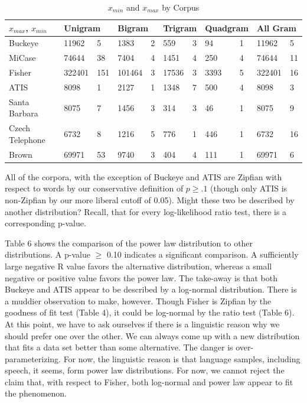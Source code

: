\documentclass[12pt]{article}
\begin{document}
\begin{table}[H]
\caption{$x_{min}$ and $x_{max}$ by Corpus}
\begin{center}
\begin{tabular}{| *{11}{l|} }
    \hline
$x_{max}$, $x_{min}$    & \multicolumn{2}{l|}{Unigram}
            & \multicolumn{2}{l|}{Bigram}
                    & \multicolumn{2}{l|}{Trigram}
                            & \multicolumn{2}{l|}{Quadgram} 
                            & \multicolumn{2}{l|}{All Gram}\\
    \hline
Buckeye   &   11962  &   5  & 1383 & 2&   559  &   3  &   94  &   1  &   11962  &   5  \\
    \hline
MiCase   &   74644  &   38  &   7404  &   4  &   1451  &   4  &   250  &   4 & 74644 & 11  \\
    \hline
Fisher   &  322401 & 151 & 101464 & 3 & 17536 & 3 & 3393 & 5 & 322401 & 16\\
    \hline
ATIS   &  8098     &    1   &   2127    &   1    &      1348 &  7     &     500  &      4 & 8098 & 3 \\
    \hline
Santa Barbara   &  8075     &   7    &  1456     &      3 & 314& 3&  46      & 1      & 8075      &      9 \\    \hline
Czech Telephone   &   6732    &     8  &    1216   &    5   &  776     &     1  & 446       & 1     & 6732 & 16  \\
    \hline
Brown & 69971 & 53 & 9740 & 3 & 404 & 4 & 111 & 1 & 69971 & 6 \\
    \hline
\end{tabular}
\end{center}
\end{table}

All of the corpora, with the exception of Buckeye and ATIS are Zipfian with respect to words by our conservative definition of $p \geq{.1}$ (though only ATIS is non-Zipfian by our more liberal cutoff of 0.05).  Might these two be described by another distribution?   Recall, that for every log-likelihood ratio test, there is a corresponding p-value.  

Table 6 shows the comparison of the power law distribution to other distributions.   A p-value $\geq$ 0.10 indicates a significant comparison.  A sufficiently large negative R value favors the alternative distribution, whereas a small negative or positive value favors the power law. The take-away is that both Buckeye and ATIS appear to be described by a log-normal distribution.  There is a muddier observation to make, however.   Though Fisher is Zipfian by the goodness of fit test (Table 4), it could be log-normal by the ratio test (Table 6). At this point, we have to ask ourselves if there is a linguistic reason why we should prefer one over the other.  We can always come up with a new distribution that fits a data set better than some alternative.  The danger is over-parameterizing.  For now, the linguistic reason is that language samples, including speech, it seems, form power law distributions.  For now, we cannot reject the claim that, with respect to Fisher, both log-normal and power law appear to fit the phenomenon.  
\end{document}
